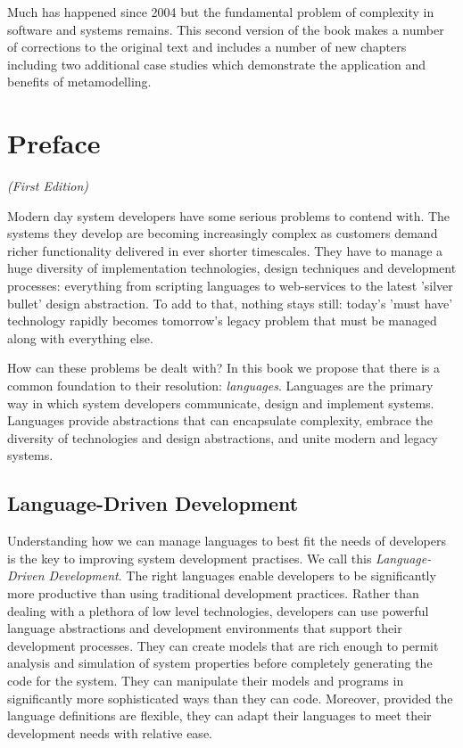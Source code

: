 Much has happened since 2004 but the fundamental problem of complexity in software and systems
remains.  This second version of the book makes a number of corrections to the original text and
includes a number of new chapters including two additional case studies which demonstrate the
application and benefits of metamodelling.

\chapter*{Preface}
\LARGE{\emph{(First Edition)}}\\[2cm]
\normalsize
{}

Modern day system developers have some serious problems to contend
with. The systems they develop are becoming increasingly complex
as customers demand richer functionality delivered in ever shorter
timescales. They have to manage a huge diversity of implementation
technologies, design techniques and development processes:
everything from scripting languages to web-services to the latest
'silver bullet' design abstraction. To add to that, nothing stays
still: today's 'must have' technology rapidly becomes tomorrow's
legacy problem that must be managed along with everything else.

How can these problems be dealt with? In this book we propose that
there is a common foundation to their resolution: {\em languages}.
Languages are the primary way in which system developers
communicate, design and implement systems. Languages provide
abstractions that can encapsulate complexity, embrace the
diversity of technologies and design abstractions, and unite
modern and legacy systems.

\section*{Language-Driven Development}

Understanding how we can manage languages to best fit the needs of
developers is the key to improving system development practises.
We call this {\em Language-Driven Development}. The right
languages enable developers to be significantly more productive
than using traditional development practices. Rather than dealing
with a plethora of low level technologies, developers can use
powerful language abstractions and development environments that
support their development processes. They can create models that
are rich enough to permit analysis and simulation of system
properties before completely generating the code for the system.
They can manipulate their models and programs in significantly
more sophisticated ways than they can code. Moreover, provided the
language definitions are flexible, they can adapt their languages
to meet their development needs with relative ease.

